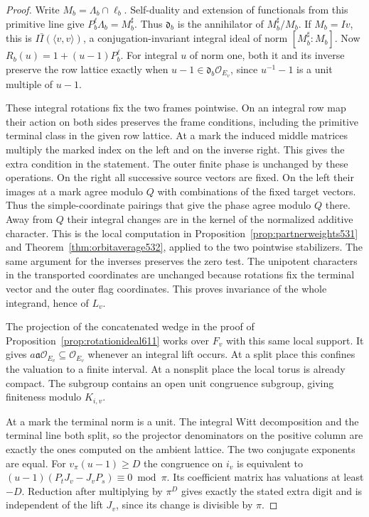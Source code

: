 \documentclass[a4paper,11pt]{article}
\theoremstyle{definition}
\theoremstyle{remark}
\numberwithin{equation}{section}
\begin{document}
\begin{proof}
Write \(M_b=\Lambda_b\cap\ell_b\). Self-duality and extension
of functionals from this primitive line give \(P_b^\ell\Lambda_b
=M_b^\sharp\). Thus \(\mathfrak d_b\) is the annihilator of
\(M_b^\sharp/M_b\). If \(M_b=Iv\), this is
\(I\bar I(\langle v,v\rangle)\), a conjugation-invariant integral
ideal of norm \([M_b^\sharp:M_b]\).
Now \(R_b(u)=1+(u-1)P_b^\ell\). For integral \(u\) of norm one,
both it and its inverse preserve the row lattice exactly when
\(u-1\in\mathfrak d_b\mathcal O_{E_v}\), since \(u^{-1}-1\)
is a unit multiple of \(u-1\).

These integral rotations fix the two frames pointwise. On an
integral row map their action on both sides preserves the frame
conditions, including the primitive terminal class in the given
row lattice. At a mark the induced middle matrices multiply the
marked index on the left and on the inverse right. This gives
the extra condition in the statement. The outer finite phase is
unchanged by these operations. On the right all successive source
vectors are fixed. On the left their images at a mark agree
modulo \(Q\) with combinations of the fixed target vectors.
Thus the simple-coordinate pairings that give the phase agree
modulo \(Q\) there. Away from \(Q\) their integral changes are
in the kernel of the normalized additive character. This is the
local computation in Proposition~\ref{prop:partnerweights531}
and Theorem~\ref{thm:orbitaverage532}, applied to the two
pointwise stabilizers. The same argument for the inverses
preserves the zero test. The unipotent characters in the
transported coordinates are unchanged because rotations fix the
terminal vector and the outer flag coordinates. This proves
invariance of the whole integrand, hence of \(L_v\).

The projection of the concatenated wedge in the proof of
Proposition~\ref{prop:rotationideal611} works over \(F_v\)
with this same local support. It gives
\(a\mathfrak a\mathcal O_{E_v}\subseteq\mathcal O_{E_v}\) whenever
an integral lift occurs. At a split place this confines the
valuation to a finite interval. At a nonsplit place the local
torus is already compact. The subgroup contains an open unit
congruence subgroup, giving finiteness modulo \(K_{i,v}\).

At a mark the terminal norm is a unit. The integral Witt
decomposition and the terminal line both split, so the projector
denominators on the positive column are exactly the ones computed
on the ambient lattice. The two conjugate exponents are equal.
For \(v_\pi(u-1)\ge D\) the congruence on \(i_v\) is equivalent
to \((u-1)(P_tJ_v-J_vP_s)\equiv0\bmod\pi\). Its coefficient
matrix has valuations at least \(-D\). Reduction after multiplying
by \(\pi^D\) gives exactly the stated extra digit and is
independent of the lift \(J_v\), since its change is divisible
by \(\pi\).


\end{proof}
\end{document}
